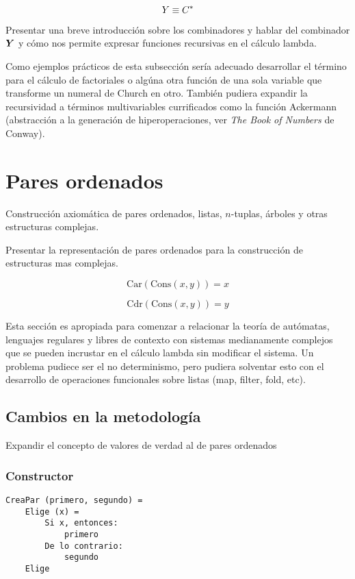 \[ Y \equiv C^{*} \]

Presentar una breve introducción sobre los combinadores y hablar del combinador \( \boldsymbol{Y} \) y cómo nos permite expresar funciones recursivas en el cálculo lambda.

Como ejemplos prácticos de esta subsección sería adecuado desarrollar el término para el cálculo de factoriales o algúna otra función de una sola variable que transforme un numeral de Church en otro. También pudiera expandir la recursividad a términos multivariables currificados como la función Ackermann (abstracción a la generación de hiperoperaciones, ver \emph{The Book of Numbers} de Conway).

\section{Pares ordenados}
\label{sec:pares-ordenados}

Construcción axiomática de pares ordenados, listas, \( n \)-tuplas, árboles y otras estructuras complejas.

Presentar la representación de pares ordenados para la construcción de estructuras mas complejas.

\[ \mathrm{Car}(\mathrm{Cons}(x,y)) = x \]

\[ \mathrm{Cdr}(\mathrm{Cons}(x,y)) = y \]

Esta sección es apropiada para comenzar a relacionar la teoría de autómatas, lenguajes regulares y libres de contexto con sistemas medianamente complejos que se pueden incrustar en el cálculo lambda sin modificar el sistema. Un problema pudiece ser el no determinismo, pero pudiera solventar esto con el desarrollo de operaciones funcionales sobre listas (map, filter, fold, etc).

\subsection*{Cambios en la metodología}

Expandir el concepto de valores de verdad al de pares ordenados

\subsubsection*{Constructor}

\begin{verbatim}
CreaPar (primero, segundo) =
    Elige (x) =
        Si x, entonces:
            primero
        De lo contrario:
            segundo
    Elige
\end{verbatim}

